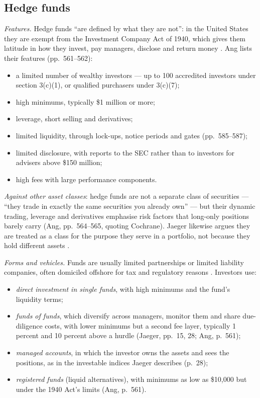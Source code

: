 \subsection{Hedge funds}

\begin{qfdefinition}\label{def:hedge-fund-features}
 \emph{Features.} Hedge funds ``are defined by what they are not'': in the United States they are exempt from the Investment Company Act of 1940, which gives them latitude in how they invest, pay managers, disclose and return money \citep[p.~559]{s7-ang}. Ang lists their features (pp.~561--562):
\begin{itemize}
\item a limited number of wealthy investors --- up to 100 accredited investors under section 3(c)(1), or qualified purchasers under 3(c)(7);
\item high minimums, typically \$1 million or more;
\item leverage, short selling and derivatives;
\item limited liquidity, through lock-ups, notice periods and gates (pp.~585--587);
\item limited disclosure, with reports to the SEC rather than to investors for advisers above \$150 million;
\item high fees with large performance components.
\end{itemize}
\emph{Against other asset classes}: hedge funds are not a separate class of securities --- ``they trade in exactly the same securities you already own'' --- but their dynamic trading, leverage and derivatives emphasise risk factors that long-only positions barely carry (Ang, pp.~564--565, quoting Cochrane). Jaeger likewise argues they are treated as a class for the purpose they serve in a portfolio, not because they hold different assets \citep[p.~11]{jaeger-alternative-beta-2008}.

\emph{Forms and vehicles.} Funds are usually limited partnerships or limited liability companies, often domiciled offshore for tax and regulatory reasons \citep[p.~10]{jaeger-alternative-beta-2008}. Investors use:
\begin{itemize}
\item \emph{direct investment in single funds}, with high minimums and the fund's liquidity terms;
\item \emph{funds of funds}, which diversify across managers, monitor them and share due-diligence costs, with lower minimums but a second fee layer, typically 1 percent and 10 percent above a hurdle (Jaeger, pp.~15, 28; Ang, p.~561);
\item \emph{managed accounts}, in which the investor owns the assets and sees the positions, as in the investable indices Jaeger describes (p.~28);
\item \emph{registered funds} (liquid alternatives), with minimums as low as \$10,000 but under the 1940 Act's limits (Ang, p.~561).
\end{itemize}


\end{qfdefinition}

